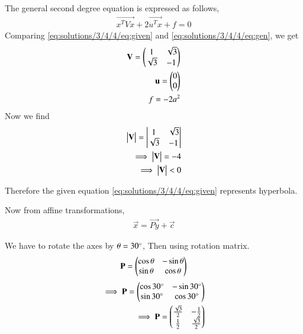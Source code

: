 The general second degree equation is expressed as follows,
\begin{align}
    \vec{x^TVx}+2\vec{u^Tx}+f=0\label{eq:solutions/3/4/4/eq:gen}
\end{align}
Comparing \eqref{eq:solutions/3/4/4/eq:given} and \eqref{eq:solutions/3/4/4/eq:gen}, we get
\begin{align}
    \mathbf{V}=\begin{pmatrix} 1 & \sqrt{3} \\ \sqrt{3} & -1 \end{pmatrix}\label{eq:solutions/3/4/4/eq:V}\\
    \mathbf{u}=\begin{pmatrix}0 \\ 0\end{pmatrix}\label{eq:solutions/3/4/4/eq:u}\\
    f=-2a^2\label{eq:solutions/3/4/4/eq:f}
\end{align}
Now we find
\begin{align}
    \begin{vmatrix}\mathbf{V}\end{vmatrix}=\begin{vmatrix}1 & \sqrt{3} \\ \sqrt{3} & -1\end{vmatrix}\\
    \implies\begin{vmatrix}\mathbf{V}\end{vmatrix}=-4\\
    \implies\begin{vmatrix}\mathbf{V}\end{vmatrix}<0
\end{align}

Therefore the given equation \eqref{eq:solutions/3/4/4/eq:given} represents  hyperbola.

Now from affine transformations,
\begin{align}
    \vec{x}=\vec{Py}+\vec{c}
\end{align}

We have to rotate the axes by $\theta=30\degree$, Then using rotation matrix.
\begin{align}
    \mathbf{P}=\begin{pmatrix}\cos\theta & -\sin\theta \\ \sin\theta & \cos\theta\end{pmatrix}
\end{align}
\begin{align}
    \implies\mathbf{P}=\begin{pmatrix}\cos30\degree & -\sin30\degree \\ \sin30\degree & \cos30\degree\end{pmatrix}\\
    \implies\mathbf{P}=\begin{pmatrix}\frac{\sqrt{3}}{2} & -\frac{1}{2} \\ \frac{1}{2} & \frac{\sqrt{3}}{2}\end{pmatrix}\label{eq:solutions/3/4/4/eq:P}
\end{align}


